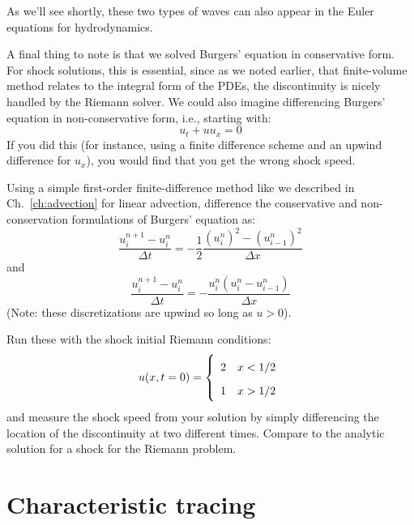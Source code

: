 As we'll see shortly, these two types of waves can also appear in the Euler equations
for hydrodynamics.

A final thing to note is that we solved Burgers' equation in conservative form.
For shock solutions, this is essential, since as we noted earlier, that finite-volume
method relates to the integral form of the PDEs, the discontinuity is nicely handled
by the Riemann solver.  We could also imagine differencing Burgers' equation in
non-conservative form, i.e., starting with:
\begin{equation}
u_t + u u_x = 0
\end{equation}
If you did this (for instance, using a finite difference scheme and an
upwind difference for $u_x$), you would find that you get the wrong
shock speed.

\begin{exercise}
{
Using a simple first-order finite-difference method like we described
in Ch.~\ref{ch:advection} for linear advection, difference the
conservative and non-conservation formulations of Burgers' equation
as:
\begin{equation}
\frac{u^{n+1}_i - u^n_i}{\Delta t} = 
   -\frac{1}{2} \frac{(u^n_i)^2 - (u^n_{i-1})^2}{\Delta x}
\end{equation}
and
\begin{equation}
  \frac{u_{i}^{n+1} - u_i^n}{\Delta t} = - 
      \frac{u_i^n (u_i^n - u_{i-1}^n)}{\Delta x}
\end{equation}
(Note: these discretizations are upwind so long as $u > 0$).

Run these with the shock initial Riemann conditions:
\begin{equation}
\renewcommand{\arraystretch}{1.75}
u(x, t=0) = \left \{ \begin{array}{cc}
    2   & x < 1/2 \\
    1   & x > 1/2
\end{array}
\right .
\renewcommand{\arraystretch}{1.0}
\end{equation}
and measure the shock speed from your solution by simply differencing
the location of the discontinuity at two different times.  Compare to
the analytic solution for a shock for the Riemann problem.}
\end{exercise}

\section{Characteristic tracing}

